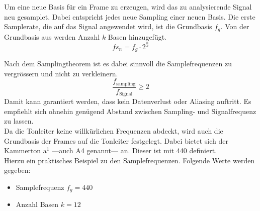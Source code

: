 Um eine neue Basis für ein Frame zu erzeugen, wird das zu analysierende Signal neu gesamplet. Dabei entspricht jedes neue Sampling einer neuen Basis. Die erste Samplerate, die auf das Signal angewendet wird, ist die Grundbasis $f_{g}$. Von der Grundbasis aus werden Anzahl $k$ Basen hinzugefügt.
\[fs_{n}=f_{g}\cdot2^{\frac{n}{k}}\]

Nach dem Samplingtheorem ist es dabei sinnvoll die Samplefrequenzen zu vergrössern und nicht zu verkleinern.
\[ \frac{f_{\text{sampling}}}{f_{\text{Signal}}} \geq 2\]
Damit kann garantiert werden, dass kein Datenverlust oder Aliasing auftritt. Es empfiehlt sich ohnehin genügend Abstand zwischen Sampling- und Signalfrequenz zu lassen.\\

Da die Tonleiter keine willkürlichen Frequenzen abdeckt, wird auch die Grundbasis der Frames auf die Tonleiter festgelegt. Dabei bietet sich der Kammerton $\text{a}^{1}$ ---auch A4 genannt--- an. Dieser ist mit 440 \text{[Hz]} definiert.\\




Hierzu ein praktisches Beispiel zu den Samplefrequenzen. Folgende Werte werden gegeben:
\begin{itemize}
	\item Samplefrequenz $f_{g}=440$\text{[Hz]}
	\item Anzahl Basen $k=12$
\end{itemize}	

